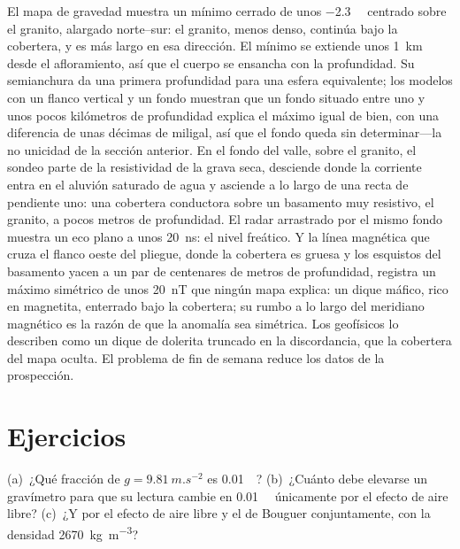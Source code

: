 \begin{example}\label{ex:b3:field-lab-methods-3:varden}
El mapa de gravedad muestra un mínimo cerrado de unos \qty{-2.3}{\milli\gal}
centrado sobre el granito, alargado norte--sur: el granito, menos denso,
continúa bajo la cobertera, y es más largo en esa dirección. El mínimo
se extiende unos \qty{1}{km} desde el afloramiento, así que el cuerpo se ensancha con
la profundidad. Su semianchura da una primera profundidad para una esfera equivalente;
los modelos con un flanco vertical y un fondo muestran que un fondo situado entre uno
y unos pocos kilómetros de profundidad explica el máximo igual de bien, con una diferencia de unas
décimas de miligal, así que el fondo queda sin determinar---la no unicidad de
la sección anterior. En el fondo del valle, sobre el granito, el
sondeo parte de la resistividad de la grava seca, desciende donde la
corriente entra en el aluvión saturado de agua y asciende a lo largo de una
recta de pendiente uno: una cobertera conductora sobre un basamento muy resistivo, el
granito, a pocos metros de profundidad. El radar arrastrado por el mismo fondo muestra un
eco plano a unos \qty{20}{ns}: el nivel freático. Y la línea magnética
que cruza el flanco oeste del pliegue, donde la cobertera es gruesa y los
esquistos del basamento yacen a un par de centenares de metros de profundidad, registra un
máximo simétrico de unos \qty{20}{nT} que ningún mapa explica: un dique máfico,
rico en magnetita, enterrado bajo la cobertera; su rumbo a lo largo del
meridiano magnético es la razón de que la anomalía sea simétrica. Los geofísicos
lo describen como un dique de dolerita truncado en la discordancia, que la
cobertera del mapa oculta. El problema de fin de semana reduce los datos de la
prospección.
\end{example}

\section{Ejercicios}

\begin{exercise}[$\star$]\label{exo:b3:field-lab-methods-3:1}
(a)~¿Qué fracción de $g = \qty{9.81}{m.s^{-2}}$ es \qty{0.01}{\milli\gal}?
(b)~¿Cuánto debe elevarse un gravímetro para que su lectura cambie
en \qty{0.01}{\milli\gal} únicamente por el efecto de aire libre? (c)~¿Y por el efecto de aire libre y el de Bouguer conjuntamente,
con la densidad
\qty{2670}{kg.m^{-3}}?
\end{exercise}

